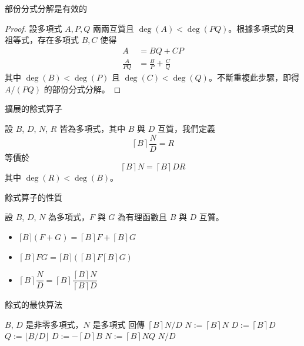 \documentclass{beamer}
\theoremstyle{remark}
\begin{document}
\begin{CJK}{UTF8}{bsmi}
\begin{frame}{部份分式分解是有效的}
  \begin{proof}
    設多項式 $A,P,Q$ 兩兩互質且 $\deg(A) < \deg(PQ)$。根據多項式的貝祖等式，存在多項式 $B,C$ 使得
    \begin{align*}
      A &= BQ + CP\\
      \frac{A}{PQ} &= \frac{B}{P} + \frac{C}{Q}
    \end{align*}
    其中 $\deg(B) < \deg(P)$ 且 $\deg(C) < \deg(Q)$。不斷重複此步驟，即得 $A/(PQ)$ 的部份分式分解。
  \end{proof}
\end{frame}

\begin{frame}{擴展的餘式算子}
  \begin{definition}
    設 $B$, $D$, $N$, $R$ 皆為多項式，其中 $B$ 與 $D$ 互質，我們定義
    \[\left\lceil B \right\rceil \frac N D = R\]
    等價於
    \[\left\lceil B \right\rceil N = \left\lceil B \right\rceil DR\]
    其中 $\deg(R) < \deg(B)$。
  \end{definition}
\end{frame}

\begin{frame}{餘式算子的性質}
  \begin{theorem}
    設 $B$, $D$, $N$ 為多項式，$F$ 與 $G$ 為有理函數且 $B$ 與 $D$ 互質。
    \begin{itemize}
      \item $\lceil B \rceil \left( F + G \right) = \left\lceil B \right\rceil F + \left\lceil B \right\rceil G$
      \item $\left\lceil B \right\rceil FG = \lceil B \rceil \left( \left\lceil B \right\rceil F \left\lceil B
	\right\rceil G\right)$
      \item $\left\lceil B \right\rceil \dfrac{N}{D} = \left\lceil B \right\rceil \dfrac{\left\lceil B \right\rceil
	N}{\left\lceil B \right\rceil D}$
    \end{itemize}
  \end{theorem}
\end{frame}

\begin{frame}{餘式的最快算法}
  \begin{algorithm}[H]
    \caption{擴展的餘式算子}
    \begin{algorithmic}[1]
      \REQUIRE $B$, $D$ 是非零多項式，$N$ 是多項式
      \ENSURE  回傳 $\left\lceil B \right\rceil N/D$
      \STATE $N := \left\lceil B \right\rceil N$
      \STATE $D := \left\lceil B \right\rceil D$
	\STATE $Q := \lfloor B/D \rfloor$
	\STATE $D := -\left\lceil D \right\rceil B$ 
	\STATE $N := \left\lceil B \right\rceil NQ$
      \ENDWHILE
      \RETURN $N/D$ 
    \end{algorithmic}
  \end{algorithm}
\end{frame}


\end{CJK}
\end{document}
